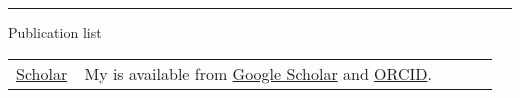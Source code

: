 \documentclass[a4paper,11pt]{concours}
\begin{document}
\vspace{0.3cm}

\noindent\begin{minipage}{0.135\linewidth}
{\color{gray120}\rule{\textwidth}{0.22cm}\relax}
\end{minipage}
\begin{minipage}{0.82\linewidth}
{\textcolor{gray120}{\huge Publication list}}
\end{minipage}
\vspace{-0.2cm}
\begin{table}[htbp]
\begin{tabular}{@{} p{0.12\linewidth} p{0.84\linewidth} @{}}
\href{https://scholar.google.fr/citations?user=9fD2JlYAAAAJ&hl}{Scholar}  & My  is available from \href{https://scholar.google.fr/citations?user=9fD2JlYAAAAJ&hl}{Google Scholar} and \href{https://orcid.org/0000-0003-2149-6706
}{ORCID}. \\
\end{tabular}
\end{table}
\end{document}
